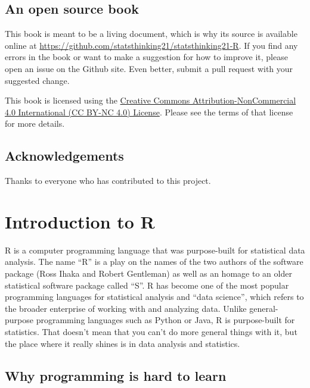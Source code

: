 \documentclass[
  12pt,
]{book}
\begin{document}
\hypertarget{an-open-source-book}{%
\section{An open source book}\label{an-open-source-book}}

This book is meant to be a living document, which is why its source is available online at \url{https://github.com/statsthinking21/statsthinking21-R}. If you find any errors in the book or want to make a suggestion for how to improve it, please open an issue on the Github site. Even better, submit a pull request with your suggested change.

This book is licensed using the \href{https://creativecommons.org/licenses/by-nc/4.0/}{Creative Commons Attribution-NonCommercial 4.0 International (CC BY-NC 4.0) License}. Please see the terms of that license for more details.

\hypertarget{acknowledgements}{%
\section{Acknowledgements}\label{acknowledgements}}

Thanks to everyone who has contributed to this project.

\hypertarget{introduction-to-r}{%
\chapter{Introduction to R}\label{introduction-to-r}}

R is a computer programming language that was purpose-built for statistical data analysis.
The name ``R'' is a play on the names of the two authors of the software package (Ross Ihaka and Robert Gentleman) as well as an homage to an older statistical software package called ``S''.
R has become one of the most popular programming languages for statistical analysis and ``data science'', which refers to the broader enterprise of working with and analyzing data. Unlike general-purpose programming languages such as Python or Java, R is purpose-built for statistics. That doesn't mean that you can't do more general things with it, but the place where it really shines is in data analysis and statistics.

\hypertarget{why-programming-is-hard-to-learn}{%
\section{Why programming is hard to learn}\label{why-programming-is-hard-to-learn}}
\end{document}
